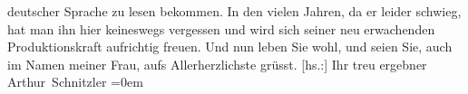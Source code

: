 \begin{ledgroupsized}[t]{13cm}
               deutscher Sprache zu lesen bekommen. In den vielen Jahren, da er leider schwieg, hat
               man ihn hier keineswegs vergessen\strikeout{,} und wird sich
               seiner neu erwachenden Produktionskraft aufrichtig freuen.\pend
           \pstart
           Und nun leben Sie wohl, und seien Sie, auch im Namen meiner Frau, aufs Allerherzlichste grüsst.\pend
           \pstart
           {[}hs.:{]} Ihr treu ergebner{\\[\baselineskip]}\spacefill\mbox{Arthur Schnitzler}\pend
           \leftskip=0em{}
         
         \endnumbering{}\end{ledgroupsized}  \newcommand{\dateiname}{L02222}\newcommand{\titel}{Arthur Schnitzler an Georg Brandes, 9. 12. 1915}\newcommand{\editorInnen}{ Martin Anton Müller und Gerd-Hermann Susen}
      